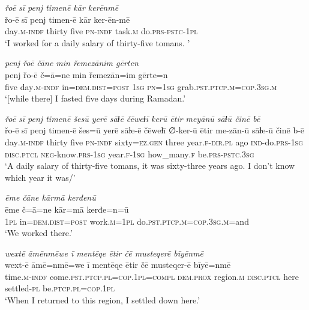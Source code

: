 \ea \label{ŽM.46}
\textit{řoē sī penj timenē kār kerēnmē} \\ 
\gll řo-ē sī penj timen-ē kār ker-ēn-mē \\ 
 day\textsc{.m}\textsc{-indf} thirty five \textsc{pn}\textsc{-indf} task\textsc{.m} do\textsc{.prs}\textsc{-pstc}\textsc{-\textsc{1pl}} \\ 
\glt `I worked for a daily salary of thirty-five tomans. '
\z 
 
\ea \label{ŽM.47}
\textit{penj řoē čāne min řemezānim gērten} \\ 
\gll penj řo-ē č=ā=ne min řemezān=im gērte=n \\ 
 five day\textsc{.m}\textsc{-indf} in=\textsc{dem.dist}\textsc{=\textsc{post}} \textsc{1sg} \textsc{pn}\textsc{=\textsc{1sg}} grab\textsc{.pst}\textsc{.ptcp}\textsc{.m}\textsc{=cop}\textsc{.3sg}\textsc{.m} \\ 
\glt `[while there] I fasted five days during Ramadan.'
\z 
 
\ea \label{ŽM.49}
\textit{řoē sī penj timenē šesū yerē sāɫē čēweɫī kerū ētir meyānū sāɫū činē bē} \\ 
\gll řo-ē sī penj timen-ē šes=ū yerē sāɫe-ē čēweɫī ∅-ker-ū ētir me-zān-ū sāɫe-ū činē b-ē \\ 
 day\textsc{.m}\textsc{-indf} thirty five \textsc{pn}\textsc{-indf} sixty\textsc{=ez.gen} three year\textsc{.f}\textsc{-dir}\textsc{.pl} ago \textsc{ind-}do\textsc{.prs}\textsc{-\textsc{1sg}} \textsc{disc}.\textsc{ptcl} \textsc{neg-}know\textsc{.prs}\textsc{-\textsc{1sg}} year\textsc{.f}\textsc{-\textsc{1sg}} how\_many\textsc{.f} be\textsc{.prs}\textsc{-pstc}\textsc{.3sg} \\ 
\glt `A daily salary of thirty-five tomans, it was sixty-three years ago. I don’t know which year it was/'
\z 
 
\ea \label{ŽM.50}
\textit{ēme čāne kārmā kerđenū} \\ 
\gll ēme č=ā=ne kār=mā kerđe=n=ū \\ 
 \textsc{1pl} in=\textsc{dem.dist}\textsc{=\textsc{post}} work\textsc{.m}\textsc{=\textsc{1pl}} do\textsc{.pst}\textsc{.ptcp}\textsc{.m}\textsc{=cop}\textsc{.3sg}\textsc{.m}=and \\ 
\glt `We worked there.'
\z 
 
\ea \label{ŽM.51}
\textit{wextē āmēnmēwe ī mentēqe ētir čē musteqerē bīyēnmē} \\ 
\gll wext-ē āmē=nmē=we ī mentēqe ētir čē musteqer-ē bīyē=nmē \\ 
 time\textsc{.m}\textsc{-indf} come\textsc{.pst}\textsc{.ptcp}\textsc{.pl}\textsc{=cop}\textsc{.\textsc{1pl}}\textsc{=compl} \textsc{dem.prox} region\textsc{.m} \textsc{disc}.\textsc{ptcl} here settled\textsc{\textsc{-pl}} be\textsc{.ptcp}\textsc{.pl}\textsc{=cop}\textsc{.\textsc{1pl}} \\ 
\glt `When I returned to this region, I settled down here.'
\z 
 
